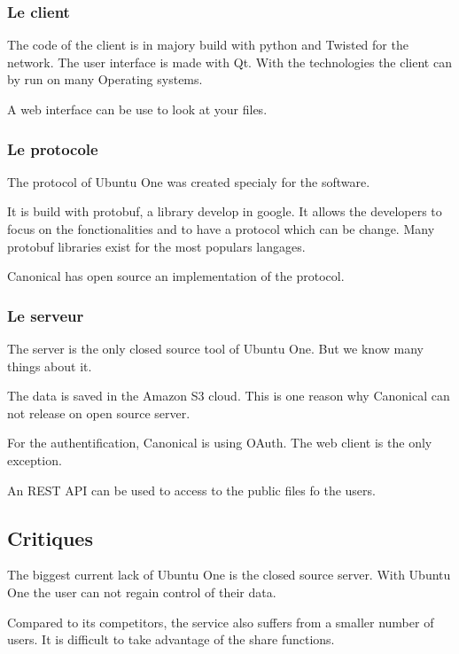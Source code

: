 \subsubsection{Le client}
The code of the client is in majory build with python and Twisted for the network. The user interface is made with Qt. With the technologies the client can by run on many Operating systems.

A web interface can be use to look at your files.

\subsubsection{Le protocole}

The protocol of Ubuntu One was created specialy for the software.

It is build with protobuf, a library develop in google. It allows the developers to focus on the fonctionalities and to have a protocol which can be change. Many protobuf libraries exist for the most populars langages.

Canonical has open source an implementation of the protocol.

\subsubsection{Le serveur}

The server is the only closed source tool of Ubuntu One. But we know many things about it.

The data is saved in the Amazon S3 cloud. This is one reason why Canonical can not release on open source server.

For the authentification, Canonical is using OAuth. The web client is the only exception.

An REST API can be used to access to the public files fo the users.

\subsection{Critiques}

The biggest current lack of Ubuntu One is the closed source server. With Ubuntu One the user can not regain control of their data.

Compared to its competitors, the service also suffers from a smaller number of users. It is difficult to take advantage of the share functions.
